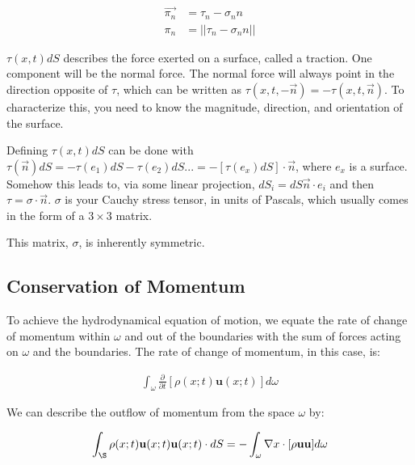 \begin{equation} \label{phenom1}
\begin{split}
\Vec{\pi_n} &= \tau_n - \sigma_nn \\
\pi_n &= ||\tau_n - \sigma_nn ||
\end{split}
\end{equation}

$\tau(x,t)dS$ describes the force exerted on a surface, called a traction. One component will be the normal force. The normal force will always point in the direction opposite of $\tau$, which can be written as $\tau(x,t,-\Vec{n}) = -\tau(x,t,\Vec{n})$. To characterize this, you need to know the magnitude, direction, and orientation of the surface.\newline

Defining $\tau(x,t)dS$ can be done with $\tau(\Vec{n})dS = -\tau(e_1)dS - \tau(e_2)dS ... = -[\tau(e_x)dS]\cdot \Vec{n}$, where $e_x$ is a surface. Somehow this leads to, via some linear projection, $dS_i = dS \Vec{n}\cdot e_i$ and then $\tau = \sigma \cdot \Vec{n}$. $\sigma$ is your Cauchy stress tensor, in units of Pascals, which usually comes in the form of a $3\times3$ matrix. \newline 

This matrix, $\sigma$, is inherently symmetric. 



\subsection{Conservation of Momentum}

To achieve the hydrodynamical equation of motion, we equate the rate of change of momentum within $\omega$ and out of the boundaries with the sum of forces acting on $\omega$ and the boundaries. The rate of change of momentum, in this case, is:

\begin{equation} \label{phenom1}
\begin{split}
\int_\omega\frac{\partial}{\partial t}[\rho(x;t)\mathbf{u}(x;t)]d\omega
\end{split}
\end{equation}

We can describe the outflow of momentum from the space $\omega$ by:

\begin{equation} \label{phenom1}
\begin{split}
\int_\S \rho(x;t)\mathbf{u}(x;t)\mathbf{u}(x;t) \cdot dS = -\int_\omega \nabla x \cdot [\rho \mathbf{u}\mathbf{u}]d\omega
\end{split}
\end{equation}


